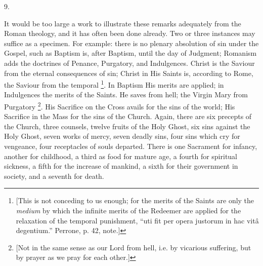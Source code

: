 9.

It would be too large a work to illustrate these remarks adequately
from the Roman theology, and it has often been done already. Two or
three instances may suffice as a specimen. For example: there is no
plenary absolution of sin under the Gospel, such as Baptism is, after
Baptism, until the day of Judgment; Romanism adds the doctrines of
Penance, Purgatory, and Indulgences. Christ is the Saviour from the
eternal consequences of sin; Christ in His Saints is, according to
Rome, the Saviour from the temporal \footnote{[This is not conceding to us enough; for the
merits of the Saints are only the \emph{medium} by which the infinite
merits of the Redeemer are applied for the relaxation of the temporal
punishment, ``uti fit per opera justorum in hac vitâ degentium.''
Perrone, p. 42, note.]}. In Baptism His merits are applied; in Indulgences the merits
of the Saints. He saves from hell; the Virgin Mary from Purgatory \footnote{[Not in the same sense as our Lord from
hell, i.e. by vicarious suffering, but by prayer as we pray for each
other.]}. His Sacrifice on the Cross avails for the sins of the world;
His Sacrifice in the Mass for the sins of the Church. Again, there are
six precepts of the Church, three counsels, twelve fruits of the Holy
Ghost, six sins against the Holy Ghost, seven works of mercy, seven
deadly sins, four sins which cry for vengeance, four receptacles of
souls departed. There is one Sacrament for infancy, another for
childhood, a third as food for mature age, a fourth for spiritual
sickness, a fifth for the increase of mankind, a sixth for their
government in society, and a seventh for death.


